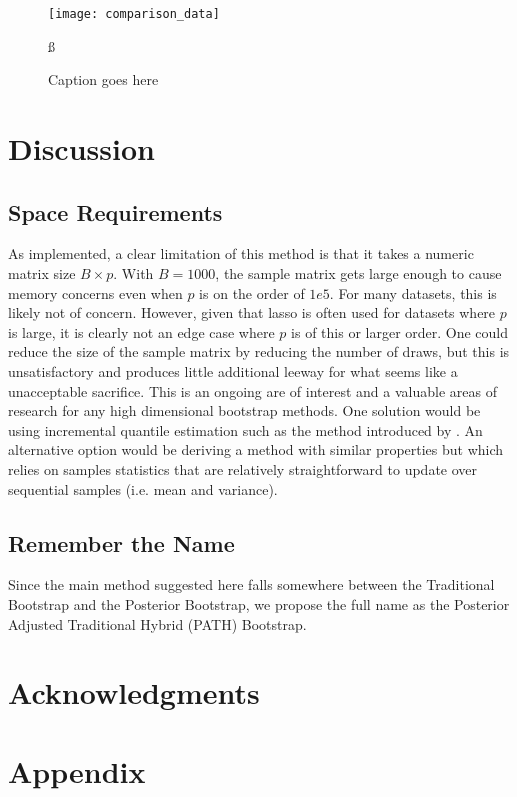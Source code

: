 \begin{figure}
  \texttt{[image: comparison\_data]}
  \caption{\label{Fig:comparison_data_whoari} Caption goes here}ß
\end{figure}

\section{Discussion}

\subsection{Space Requirements}

As implemented, a clear limitation of this method is that it takes a numeric matrix size $B \times p$. With $B = 1000$, the sample matrix gets large enough to cause memory concerns even when $p$ is on the order of $1e5$. For many datasets, this is likely not of concern. However, given that lasso is often used for datasets where $p$ is large, it is clearly not an edge case where $p$ is of this or larger order. One could reduce the size of the sample matrix by reducing the number of draws, but this is unsatisfactory and produces little additional leeway for what seems like a unacceptable sacrifice. This is an ongoing are of interest and a valuable areas of research for any high dimensional bootstrap methods. One solution would be using incremental quantile estimation such as the method introduced by \cite{Tierney1983}. An alternative option would be deriving a method with similar properties but which relies on samples statistics that are relatively straightforward to update over sequential samples (i.e. mean and variance).

\subsection{Remember the Name}

Since the main method suggested here falls somewhere between the Traditional Bootstrap and the Posterior Bootstrap, we propose the full name as the Posterior Adjusted Traditional Hybrid (PATH) Bootstrap.

\section*{Acknowledgments}

\section*{Appendix}


